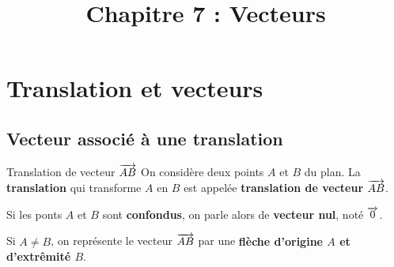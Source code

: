 \documentclass[11pt]{article}
\title{Chapitre 7 : Vecteurs}
\date{}
\author{}
\begin{document}
\maketitle\thispagestyle{fancy}

%

\section{Translation et vecteurs}
\subsection{Vecteur associé à une translation}
\noindent\begin{minipage}{.7\textwidth}
  \begin{defi}{Translation de vecteur $\overrightarrow{AB}$}
    On considère deux points $A$ et $B$ du plan. La \textbf{translation} qui
    transforme $A$ en $B$ est appelée \textbf{translation de vecteur}
    $\overrightarrow{AB}$.
  \end{defi}
  \begin{rmq}
    Si les ponts $A$ et $B$ sont \textbf{confondus}, on parle alors de
    \textbf{vecteur nul}, noté $\overrightarrow{0}$.
  \end{rmq}
\end{minipage}
\begin{minipage}{.3\textwidth}
  \begin{center}
  \end{center}
\end{minipage}

\begin{notation}
  Si $A\neq B$, on représente le vecteur $\overrightarrow{AB}$ par une \textbf{flèche
  d'origine $A$ et d'extrêmité $B$}.
\end{notation}
\end{document}
